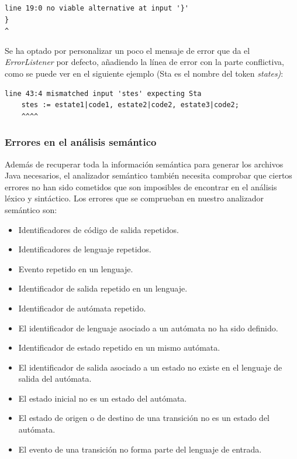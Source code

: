 \documentclass{pre-tfg}
\begin{document}
\begin{lstlisting}[caption=Mensaje de error para test2.moo.]
line 19:0 no viable alternative at input '}'
}
^
\end{lstlisting}

Se ha optado por personalizar un poco el mensaje de error que da el \textit{ErrorListener} por defecto, añadiendo la línea de error con la parte conflictiva, como se puede ver en el siguiente ejemplo (Sta es el nombre del token \textit{states)}:

\begin{lstlisting}[caption=Mesaje de error para un token mal formado.]
line 43:4 mismatched input 'stes' expecting Sta
    stes := estate1|code1, estate2|code2, estate3|code2;
    ^^^^
\end{lstlisting}

\subsubsection{Errores en el análisis semántico}
Además de recuperar toda la información semántica para generar los archivos Java necesarios, el analizador semántico también necesita comprobar que ciertos errores no han sido cometidos que son imposibles de encontrar en el análisis léxico y sintáctico. Los errores que se comprueban en nuestro analizador semántico son:
\begin{itemize}
    \item Identificadores de código de salida repetidos.
    \item Identificadores de lenguaje repetidos.
    \item Evento repetido en un lenguaje.
    \item Identificador de salida repetido en un lenguaje.
    \item Identificador de autómata repetido.
    \item El identificador de lenguaje asociado a un autómata no ha sido definido.
    \item Identificador de estado repetido en un mismo autómata.
    \item El identificador de salida asociado a un estado no existe en el lenguaje de salida del autómata.
    \item El estado inicial no es un estado del autómata.
    \item El estado de origen o de destino de una transición no es un estado del autómata.
    \item El evento de una transición no forma parte del lenguaje de entrada.
\end{itemize}
\end{document}
